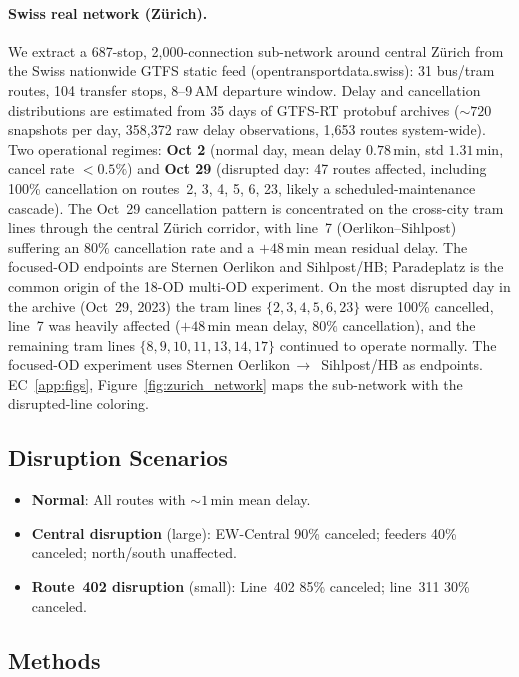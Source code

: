 \documentclass[opre,dblanonrev]{informs4}
\begin{document}
\paragraph{Swiss real network (Zürich).} We extract a 687-stop,
2{,}000-connection sub-network around central Zürich from the Swiss
nationwide GTFS static feed (opentransportdata.swiss): 31 bus/tram
routes, 104 transfer stops, 8--9\,AM departure window. Delay and
cancellation distributions are estimated from 35 days of GTFS-RT
protobuf archives (${\sim}720$ snapshots per day, 358{,}372 raw delay
observations, 1{,}653 routes system-wide). Two operational regimes:
\textbf{Oct 2} (normal day, mean delay $0.78$\,min, std $1.31$\,min,
cancel rate $<0.5\%$) and \textbf{Oct 29} (disrupted day: 47 routes
affected, including 100\% cancellation on routes~2, 3, 4, 5, 6, 23,
likely a scheduled-maintenance cascade).
The Oct~29 cancellation pattern is concentrated on the cross-city
tram lines through the central Z\"urich corridor, with line~7
(Oerlikon--Sihlpost) suffering an $80\%$ cancellation rate and a
$+48$\,min mean residual delay. The focused-OD endpoints are
Sternen Oerlikon and Sihlpost/HB; Paradeplatz is the common
origin of the 18-OD multi-OD experiment.
On the most disrupted day in the archive (Oct~29, 2023) the tram
lines $\{2,3,4,5,6,23\}$ were 100\% cancelled, line~7 was heavily
affected ($+48$\,min mean delay, $80\%$ cancellation), and the
remaining tram lines $\{8,9,10,11,13,14,17\}$ continued to operate
normally. The focused-OD experiment uses Sternen Oerlikon\,$\to$\,
Sihlpost/HB as endpoints. EC~\ref{app:figs}, Figure~\ref{fig:zurich_network} maps the sub-network with the disrupted-line coloring.

\subsection{Disruption Scenarios}

\begin{itemize}
    \item \textbf{Normal}: All routes with ${\sim}1$\,min mean delay.
    \item \textbf{Central disruption} (large): EW-Central 90\% canceled; feeders 40\% canceled; north/south unaffected.
    \item \textbf{Route~402 disruption} (small): Line~402 85\% canceled; line~311 30\% canceled.
\end{itemize}

\subsection{Methods}
\end{document}

